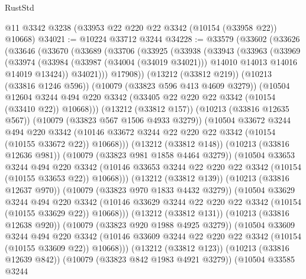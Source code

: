 \begin{lexlean}{RustStd}
\begin{coremodule}
    @11
    @3342
    @3238
    (@33953 @22 @220 @22 @3342 (@10154 (@33958 @22)) @10668)
@34021 := @10224 @33712 @3244
@34228 := @33579
    (@33602
      (@33626
        (@33646
          (@33670
            (@33689
              (@33706
                (@33925
                  (@33938
                    (@33943
                      (@33963
                        (@33969
                          (@33974
                            (@33984
                              (@33987 (@34004 (@34019 @34021)))
                              @14010
                              @14013
                              @14016
                              @14019
                              @13424))
                          @34021)))
                    @17908))
                (@13212 (@33812 @219))
                (@10213 (@33816 @1246 @596))
                (@10079 (@33823 @596 @413 @4609 @3279))
                (@10504
                  @12604
                  @3244
                  @494
                  @220
                  @3342
                  (@33405 @22 @220 @22 @3342 (@10154 (@33410 @22)) @10668)))
              (@13212 (@33812 @157))
              (@10213 (@33816 @12635 @567))
              (@10079 (@33823 @567 @1506 @4933 @3279))
              (@10504
                @33672
                @3244
                @494
                @220
                @3342
                (@10146 @33672 @3244 @22 @220 @22 @3342 (@10154 (@10155 @33672 @22)) @10668)))
            (@13212 (@33812 @148))
            (@10213 (@33816 @12636 @981))
            (@10079 (@33823 @981 @1858 @4464 @3279))
            (@10504
              @33653
              @3244
              @494
              @220
              @3342
              (@10146 @33653 @3244 @22 @220 @22 @3342 (@10154 (@10155 @33653 @22)) @10668)))
          (@13212 (@33812 @139))
          (@10213 (@33816 @12637 @970))
          (@10079 (@33823 @970 @1833 @4432 @3279))
          (@10504
            @33629
            @3244
            @494
            @220
            @3342
            (@10146 @33629 @3244 @22 @220 @22 @3342 (@10154 (@10155 @33629 @22)) @10668)))
        (@13212 (@33812 @131))
        (@10213 (@33816 @12638 @920))
        (@10079 (@33823 @920 @1988 @4925 @3279))
        (@10504
          @33609
          @3244
          @494
          @220
          @3342
          (@10146 @33609 @3244 @22 @220 @22 @3342 (@10154 (@10155 @33609 @22)) @10668)))
      (@13212 (@33812 @123))
      (@10213 (@33816 @12639 @842))
      (@10079 (@33823 @842 @1983 @4921 @3279))
      (@10504
        @33585
        @3244

\end{coremodule}
\end{lexlean}
